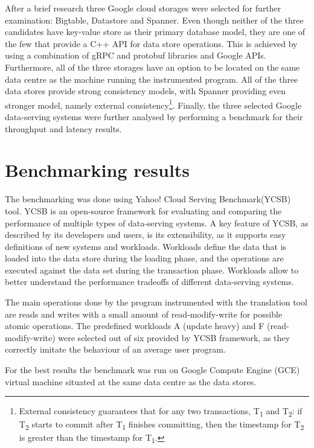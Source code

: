 \documentclass[bsc,frontabs,twoside,singlespacing,parskip,deptreport]{infthesis}     %
\begin{document}
After a brief research three Google cloud storages were selected for further examination: Bigtable, Datastore and Spanner. Even though neither of the three candidates have key-value store as their primary database model, they are one of the few that provide a C++ API for data store operations. This is achieved by using a combination of gRPC and protobuf libraries and Google APIs. Furthermore, all of the three storages have an option to be located on the same data centre as the machine running the instrumented program. All of the three data stores provide strong consistency models, with Spanner providing even stronger model, namely external consistency\footnote{External consistency guarantees that for any two transactions, T\textsubscript{1} and T\textsubscript{2}: if T\textsubscript{2} starts to commit after T\textsubscript{1} finishes committing, then the timestamp for T\textsubscript{2} is greater than the timestamp for T\textsubscript{1}.}. Finally, the three selected Google data-serving systems were further analysed by performing a benchmark for their throughput and latency results.

\section{Benchmarking results}

The benchmarking was done using Yahoo! Cloud Serving Benchmark(YCSB) \citep{ycsb} tool. YCSB is an open-source framework for evaluating and comparing the performance of multiple types of data-serving systems. A key feature of YCSB, as described by its developers and users, is its extensibility, as it supports easy definitions of new systems and workloads. Workloads define the data that is loaded into the data store during the loading phase, and the operations are executed against the data set during the transaction phase. Workloads allow to better understand the performance tradeoffs of different data-serving systems.

The main operations done by the program instrumented with the translation tool are reads and writes with a small amount of read-modify-write for possible atomic operations. The predefined workloads A (update heavy) and F (read-modify-write) were selected out of six provided by YCSB framework, as they correctly imitate the behaviour of an average user program. 

For the best results the benchmark was run on Google Compute Engine (GCE) virtual machine situated at the same data centre as the data stores.
\end{document}

